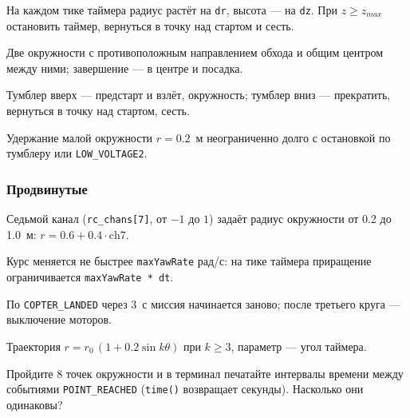 \begin{taskbox}[Спираль]
На каждом тике таймера радиус растёт на \verb|dr|, высота --- на \verb|dz|. При $z \ge z_{max}$ остановить таймер, вернуться в точку над стартом и сесть.
\end{taskbox}

\begin{taskbox}[Восьмёрка]
Две окружности с противоположным направлением обхода и общим центром между ними; завершение --- в центре и посадка.
\end{taskbox}

\begin{taskbox}
Тумблер вверх --- предстарт и взлёт, окружность; тумблер вниз --- прекратить, вернуться в точку над стартом, сесть.
\end{taskbox}

\begin{taskbox}[Лоитер]
Удержание малой окружности $r = 0.2$~м неограниченно долго с остановкой по тумблеру или \verb|LOW_VOLTAGE2|.
\end{taskbox}

\subsubsection*{Продвинутые}

\begin{taskbox}
Седьмой канал (\verb|rc_chans[7]|, от $-1$ до $1$) задаёт радиус окружности от 0.2 до 1.0~м: $r = 0.6 + 0.4\cdot\mathrm{ch7}$.
\end{taskbox}

\begin{taskbox}
Курс меняется не быстрее \verb|maxYawRate| рад/с: на тике таймера приращение ограничивается \verb|maxYawRate * dt|.
\end{taskbox}

\begin{taskbox}
По \verb|COPTER_LANDED| через 3~с миссия начинается заново; после третьего круга --- выключение моторов.
\end{taskbox}

\begin{taskbox}[Лепесток]
Траектория $r = r_0\,(1 + 0.2\sin k\theta)$ при $k \ge 3$, параметр --- угол таймера.
\end{taskbox}

\begin{taskbox}
Пройдите 8 точек окружности и в терминал печатайте интервалы времени между событиями \verb|POINT_REACHED| (\verb|time()| возвращает секунды). Насколько они одинаковы?
\end{taskbox}

